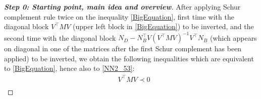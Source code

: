 \documentclass[11pt,a4paper,oneside,DIV=12,headings=small]{scrartcl}
\theoremstyle{plain}
\newcounter{MYtempeqncnt}
\begin{document}
\begin{proof}[\textbf{Step 0: \emph{Starting point, main idea and overview}}]
After applying Schur complement rule twice on the inequality \eqref{BigEquation}, first time with the diagonal block $V^\top M V$ (upper left block in \eqref{BigEquation}) to be inverted, and the second time with the diagonal block $N_D-N_B^\top V (V^\top M V)^{-1} V^\top N_B $ (which appears on diagonal in one of the matrices after the first Schur complement has been applied) to be inverted, we obtain the following inequalities which are equivalent to \eqref{BigEquation}, hence also to \eqref{NN2_53}:
\begin{subequations}
\label{DisCompact}
\begin{align}
&V^\top M V \prec 0  \label{DisCompact0} \\

\end{align}
\end{subequations}
\end{proof}
\end{document}
